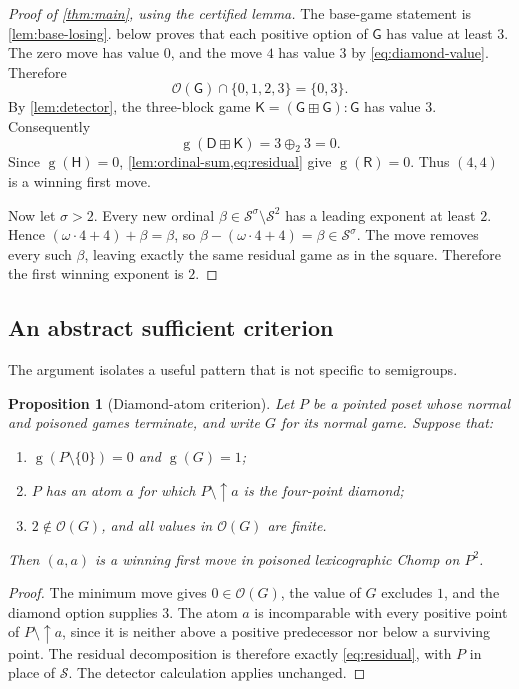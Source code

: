 \documentclass[11pt,letterpaper]{article}
\numberwithin{equation}{section}
\newtheorem{proposition}[theorem]{Proposition}
\theoremstyle{definition}
\newcommand{\Sg}{\mathcal S}
\newcommand{\Gr}{\operatorname{g}}
\newcommand{\Opt}{\mathcal O}
\newcommand{\ps}{\mathbin{\boxplus}}
\newcommand{\xo}{\mathbin{\oplus_{\!2}}}
\renewcommand{\Game}{\mathsf G}
\newcommand{\Poison}{\mathsf H}
\newcommand{\DiamondGame}{\mathsf D}
\newcommand{\KGame}{\mathsf K}
\newcommand{\RGame}{\mathsf R}
\begin{document}
\begin{proof}[Proof of \cref{thm:main}, using the certified lemma]
The base-game statement is \cref{lem:base-losing}.
 below proves that each positive option of $\Game$
has value at least $3$. The zero move has value $0$, and the move $4$ has
value $3$ by \cref{eq:diamond-value}. Therefore
\[
 \Opt(\Game)\cap\{0,1,2,3\}=\{0,3\}.
\]
By \cref{lem:detector}, the three-block game
$\KGame=(\Game\ps\Game):\Game$ has value $3$. Consequently
\[
 \Gr(\DiamondGame\ps\KGame)=3\xo3=0.
\]
Since $\Gr(\Poison)=0$, \cref{lem:ordinal-sum,eq:residual} give
$\Gr(\RGame)=0$. Thus $(4,4)$ is a winning first move.

Now let $\sigma>2$. Every new ordinal $\beta\in\Sg^\sigma\setminus\Sg^2$
has a leading exponent at least $2$. Hence
$(\omega\cdot4+4)+\beta=\beta$, so
$\beta-(\omega\cdot4+4)=\beta\in\Sg^\sigma$. The move removes every such
$\beta$, leaving exactly the same residual game as in the square.
Therefore the first winning exponent is $2$.
\end{proof}

\subsection{An abstract sufficient criterion}

The argument isolates a useful pattern that is not specific to semigroups.

\begin{proposition}[Diamond-atom criterion]\label{prop:criterion}
Let $P$ be a pointed poset whose normal and poisoned games terminate, and
write $G$ for its normal game. Suppose that:
\begin{enumerate}[label=\textup{(\alph*)}]
\item $\Gr(P\setminus\{0\})=0$ and $\Gr(G)=1$;
\item $P$ has an atom $a$ for which $P\setminus\uparrow a$ is the four-point
      diamond;
\item $2\notin\Opt(G)$, and all values in $\Opt(G)$ are finite.
\end{enumerate}
Then $(a,a)$ is a winning first move in poisoned lexicographic Chomp on
$P^2$.
\end{proposition}
\begin{proof}
The minimum move gives $0\in\Opt(G)$, the value of $G$ excludes $1$, and
the diamond option supplies $3$. The atom $a$ is incomparable with every
positive point of $P\setminus\uparrow a$, since it is neither above a
positive predecessor nor below a surviving point. The residual decomposition
is therefore exactly \cref{eq:residual}, with $P$ in place of $\Sg$.
The detector calculation applies unchanged.
\end{proof}
\end{document}
